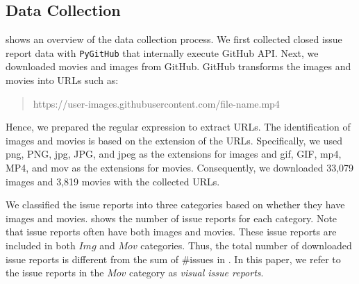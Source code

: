 \subsection{Data Collection}
 shows an overview of 
the data collection process. 
We first collected closed issue report data with \texttt{PyGitHub} 
that internally execute GitHub API. 
Next, we downloaded movies and images from GitHub.
GitHub transforms the images and movies into URLs such as:
\begin{quote}
	https://user-images.githubusercontent.com/file-name.mp4
	\\
\end{quote}
Hence, we prepared the regular expression 
to extract URLs. 
The identification of images and movies is based on the extension of 
the URLs. 
Specifically, we used png, PNG, jpg, JPG, and jpeg as 
the extensions for images and 
gif, GIF, mp4, MP4, and mov as the extensions for movies.
Consequently, we downloaded 33,079 images and 3,819 movies
with the collected URLs. 

We classified the issue reports into three categories based on 
whether they have images and movies. 
 shows the number of issue reports for each category. 
Note that issue reports often have both images and movies. 
These issue reports are included in both $Img$ and $Mov$ categories. 
Thus, the total number of downloaded issue reports is different from 
the sum of \#issues in . 
In this paper, we refer to the issue reports in the $Mov$ category 
as \textit{visual issue reports}. 



% 

